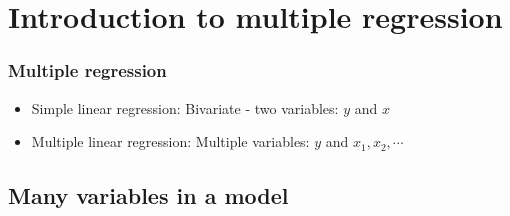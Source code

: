 \section{Introduction to multiple regression}


\begin{frame}
\frametitle{Multiple regression}

\begin{itemize}

\item Simple linear regression: Bivariate - two variables: $y$ and $x$

\item Multiple linear regression: Multiple variables: $y$ and $x_1, x_2, \cdots$

\end{itemize}

\end{frame}


\subsection{Many variables in a model}


